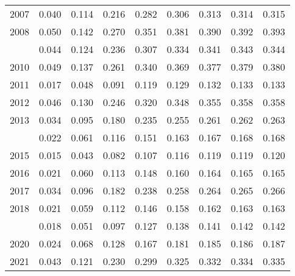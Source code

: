 \documentclass[
]{article}
\begin{document}
\begin{longtable}[t]{lrrrrrrrr}
2007 & 0.040 & 0.114 & 0.216 & 0.282 & 0.306 & 0.313 & 0.314 & 0.315\\
2008 & 0.050 & 0.142 & 0.270 & 0.351 & 0.381 & 0.390 & 0.392 & 0.393\\
\addlinespace
2009 & 0.044 & 0.124 & 0.236 & 0.307 & 0.334 & 0.341 & 0.343 & 0.344\\
2010 & 0.049 & 0.137 & 0.261 & 0.340 & 0.369 & 0.377 & 0.379 & 0.380\\
2011 & 0.017 & 0.048 & 0.091 & 0.119 & 0.129 & 0.132 & 0.133 & 0.133\\
2012 & 0.046 & 0.130 & 0.246 & 0.320 & 0.348 & 0.355 & 0.358 & 0.358\\
2013 & 0.034 & 0.095 & 0.180 & 0.235 & 0.255 & 0.261 & 0.262 & 0.263\\
\addlinespace
2014 & 0.022 & 0.061 & 0.116 & 0.151 & 0.163 & 0.167 & 0.168 & 0.168\\
2015 & 0.015 & 0.043 & 0.082 & 0.107 & 0.116 & 0.119 & 0.119 & 0.120\\
2016 & 0.021 & 0.060 & 0.113 & 0.148 & 0.160 & 0.164 & 0.165 & 0.165\\
2017 & 0.034 & 0.096 & 0.182 & 0.238 & 0.258 & 0.264 & 0.265 & 0.266\\
2018 & 0.021 & 0.059 & 0.112 & 0.146 & 0.158 & 0.162 & 0.163 & 0.163\\
\addlinespace
2019 & 0.018 & 0.051 & 0.097 & 0.127 & 0.138 & 0.141 & 0.142 & 0.142\\
2020 & 0.024 & 0.068 & 0.128 & 0.167 & 0.181 & 0.185 & 0.186 & 0.187\\
2021 & 0.043 & 0.121 & 0.230 & 0.299 & 0.325 & 0.332 & 0.334 & 0.335\\*
\end{longtable}
\end{document}
